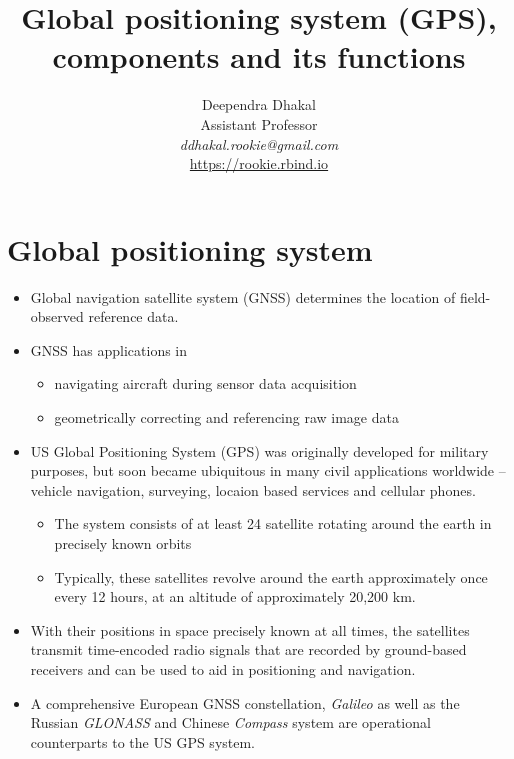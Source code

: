 \documentclass[11pt,dvipsnames,ignorenonframetext,aspectratio=169]{beamer}
\title[]{Global positioning system (GPS), components and its
functions}
\author[
        \vspace{-0.5cm}Deependra Dhakal\\
Assistant Professor\\
\textit{ddhakal.rookie@gmail.com}\\
\url{https://rookie.rbind.io}
    ]{\vspace{-0.5cm}Deependra Dhakal\\
Assistant Professor\\
\textit{ddhakal.rookie@gmail.com}\\
\url{https://rookie.rbind.io}}
\date[
      
  ]{
    }
\providecommand{\tightlist}{%
  \setlength{\itemsep}{0pt}\setlength{\parskip}{0pt}}
\begin{document}
  \begin{frame}[plain]
  \titlepage
  \end{frame}



\hypertarget{global-positioning-system}{%
\section{Global positioning system}\label{global-positioning-system}}

\begin{frame}{}
\protect\hypertarget{section}{}
\begin{itemize}
\tightlist
\item
  Global navigation satellite system (GNSS) determines the location of
  field-observed reference data.
\item
  GNSS has applications in

  \begin{itemize}
  \tightlist
  \item
    navigating aircraft during sensor data acquisition
  \item
    geometrically correcting and referencing raw image data
  \end{itemize}
\item
  US Global Positioning System (GPS) was originally developed for
  military purposes, but soon became ubiquitous in many civil
  applications worldwide -- vehicle navigation, surveying, locaion based
  services and cellular phones.

  \begin{itemize}
  \tightlist
  \item
    The system consists of at least 24 satellite rotating around the
    earth in precisely known orbits
  \item
    Typically, these satellites revolve around the earth approximately
    once every 12 hours, at an altitude of approximately 20,200 km.
  \end{itemize}
\end{itemize}
\end{frame}

\begin{frame}{}
\protect\hypertarget{section-1}{}
\begin{itemize}
\tightlist
\item
  With their positions in space precisely known at all times, the
  satellites transmit time-encoded radio signals that are recorded by
  ground-based receivers and can be used to aid in positioning and
  navigation.
\item
  A comprehensive European GNSS constellation, \emph{Galileo} as well as
  the Russian \emph{GLONASS} and Chinese \emph{Compass} system are
  operational counterparts to the US GPS system.
\end{itemize}
\end{frame}
\end{document}
